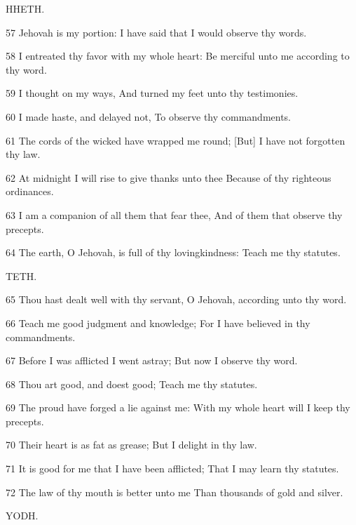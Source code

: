 \par HHETH.

\par 57 Jehovah is my portion: I have said that I would observe thy words.
\par 58 I entreated thy favor with my whole heart: Be merciful unto me according to thy word.
\par 59 I thought on my ways, And turned my feet unto thy testimonies.
\par 60 I made haste, and delayed not, To observe thy commandments.
\par 61 The cords of the wicked have wrapped me round; [But] I have not forgotten thy law.
\par 62 At midnight I will rise to give thanks unto thee Because of thy righteous ordinances.
\par 63 I am a companion of all them that fear thee, And of them that observe thy precepts.
\par 64 The earth, O Jehovah, is full of thy lovingkindness: Teach me thy statutes.

\par TETH.

\par 65 Thou hast dealt well with thy servant, O Jehovah, according unto thy word.
\par 66 Teach me good judgment and knowledge; For I have believed in thy commandments.
\par 67 Before I was afflicted I went astray; But now I observe thy word.
\par 68 Thou art good, and doest good; Teach me thy statutes.
\par 69 The proud have forged a lie against me: With my whole heart will I keep thy precepts.
\par 70 Their heart is as fat as grease; But I delight in thy law.
\par 71 It is good for me that I have been afflicted; That I may learn thy statutes.
\par 72 The law of thy mouth is better unto me Than thousands of gold and silver.

\par YODH.

